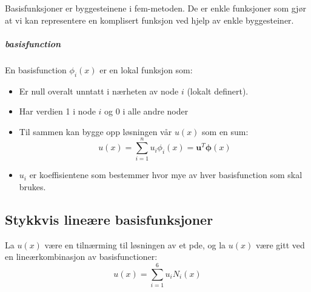 Basisfunksjoner er byggesteinene i \gls{fem}-metoden.
De er enkle funksjoner som gjør at vi kan representere en komplisert funksjon ved hjelp av enkle byggesteiner.

\subparagraph{\gls{basisfunction}}
En \gls{basisfunction} \(\phi_i(x)\) er en lokal funksjon som:
\begin{itemize}
  \item Er null overalt unntatt i nærheten av node \(i\) (lokalt definert).
  \item Har verdien 1 i node \(i\) og 0 i alle andre noder
  \item Til sammen kan bygge opp løsningen vår \(u(x)\) som en sum:
        \[
          u(x) = \sum_{i=1}^n u_i \phi_i(x) = \symbf{u}^T \symbf{\phi}(x)
        \]
  \item \(u_i\) er koeffisientene som bestemmer hvor mye av hver \gls{basisfunction} som skal brukes.
\end{itemize}


\subsection{Stykkvis lineære basisfunksjoner}

La \(u(x)\) være en tilnærming til løsningen av et \gls{pde}, og la \(u(x)\) være gitt ved en lineærkombinasjon av \gls{basisfunction}er:
\[
  u(x) = \sum_{i=1}^6 u_i N_i(x)
\]


